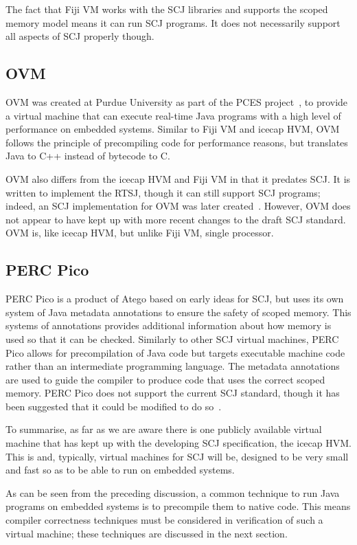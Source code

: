 \documentclass[a4paper,10pt]{report}
\begin{document}
The fact that Fiji VM works with the SCJ libraries and supports the scoped
memory model means it can run SCJ programs.  It does not necessarily support all
aspects of SCJ properly though.

\subsection{OVM}

OVM was created at Purdue University as part of the PCES
project~\cite{baker2006}, to provide a virtual machine that can execute
real-time Java programs with a high level of performance on embedded systems.
Similar to Fiji VM and icecap HVM, OVM follows the principle of precompiling
code for performance reasons, but translates Java to C++ instead of bytecode to
C.

OVM also differs from the icecap HVM and Fiji VM in that it predates SCJ. It is
written to implement the RTSJ, though it can still support SCJ programs; indeed,
an SCJ implementation for OVM was later created~\cite{plsek2010}. However, OVM
does not appear to have kept up with more recent changes to the draft SCJ
standard. OVM is, like icecap HVM, but unlike Fiji VM, single processor.

\subsection{PERC Pico}

PERC Pico is a product of Atego based on early ideas for SCJ, but uses its own
system of Java metadata annotations to ensure the safety of scoped memory.  This
systems of annotations provides additional information about how memory is
used so that it can be checked.  Similarly to other SCJ virtual machines, PERC
Pico allows for precompilation of Java code but targets executable machine code
rather than an intermediate programming language.  The metadata annotations are
used to guide the compiler to produce code that uses the correct scoped memory.
PERC Pico does not support the current SCJ standard, though it has been
suggested that it could be modified to do so~\cite{nilsen2011}.

To summarise, as far as we are aware there is one publicly available virtual
machine that has kept up with the developing SCJ specification, the icecap
HVM. This is and, typically, virtual machines for SCJ will be, designed to be
very small and fast so as to be able to run on embedded systems.

As can be seen from the preceding discussion, a common technique to run Java
programs on embedded systems is to precompile them to native code. This means
compiler correctness techniques must be considered in verification of such a
virtual machine; these techniques are discussed in the next section.
\end{document}

